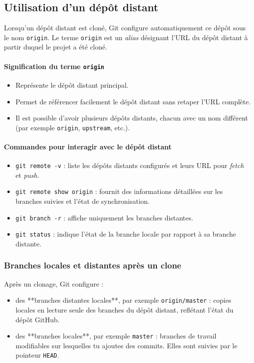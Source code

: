 \documentclass{article}
\begin{document}
\subsection{Utilisation d’un dépôt distant}

Lorsqu’un dépôt distant est cloné, Git configure automatiquement ce dépôt sous le nom \texttt{origin}. Le terme \texttt{origin} est un \emph{alias} désignant l’URL du dépôt distant à partir duquel le projet a été cloné.  

\paragraph{Signification du terme \texttt{origin}}
\begin{itemize}
    \item Représente le dépôt distant principal.
    \item Permet de référencer facilement le dépôt distant sans retaper l’URL complète.
    \item Il est possible d’avoir plusieurs dépôts distants, chacun avec un nom différent (par exemple \texttt{origin}, \texttt{upstream}, etc.).
\end{itemize}

\paragraph{Commandes pour interagir avec le dépôt distant}
\begin{itemize}
    \item \texttt{git remote -v} : liste les dépôts distants configurés et leurs URL pour \emph{fetch} et \emph{push}.
    \item \texttt{git remote show origin} : fournit des informations détaillées sur les branches suivies et l’état de synchronisation.
    \item \texttt{git branch -r} : affiche uniquement les branches distantes.
    \item \texttt{git status} : indique l’état de la branche locale par rapport à sa branche distante.
\end{itemize}

\subsubsection{Branches locales et distantes après un clone}

Après un clonage, Git configure :
\begin{itemize}
    \item des **branches distantes locales**, par exemple \texttt{origin/master} : copies locales en lecture seule des branches du dépôt distant, reflétant l’état du dépôt GitHub.
    \item des **branches locales**, par exemple \texttt{master} : branches de travail modifiables sur lesquelles tu ajoutes des commits. Elles sont suivies par le pointeur \texttt{HEAD}.
\end{itemize}
\end{document}
